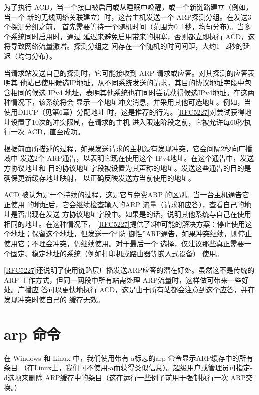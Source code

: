 为了执行 ACD，当一个接口被启用或从睡眠中唤醒，或一个新链路建立（例如，当一个
新的无线网络关联建立）时，这台主机发送一个 ARP探测分组。在发送3个探测分组之前，
首先需要等待一个随机时间（范围为0~1秒，均匀分布）。当多个系统同时启用时，通过
延迟来避免启用带来的拥塞，否则都立即执行 ACD，这将导致网络流量激增。探测分组之
间存在一个随机的时间间距，大约1 ~2秒的延迟（均匀分布）。

当请求站发送自己的探测时，它可能接收到 ARP 请求或应答。对其探测的应答表明其
他站已使用候选IP地址。从不同系统发送的请求，其目的协议地址字段中包含相同的候选
IPv4 地址，表明其他系统也在同时尝试获得候选IPv4地址。在这两种情况下，该系统将会
显示一个地址冲突消息，并采用其他可选地址。例如，当使用DHCP（见第6章）分配地址
时，这是推荐的行为。\href{https://www.rfc-editor.org/rfc/rfc5227}{[RFC5227]}对尝试获得地址设置了10次的冲突限制，在请求的主机
进入限速阶段之前，它被允许每60秒执行一次 ACD，直至成功。

根据前面所描述的过程，如果发送请求的主机没有发现冲突，它会间隔2秒向广播域中
发送2个 ARP通告，以表明它现在使用这个 IPv4地址。在这个通告中，发送方协议地址和
目的协议地址字段被设置为其声称的地址。发送这些通告的目的是确保更新缓存地址映射，
以正确反映发送方当前使用的地址。

ACD 被认为是一个持续的过程，这是它与免费ARP 的区别。当一台主机通告它正使用
的地址后，它会继续检查输人的ARP 流量（请求和应答），查看自己的地址是否出现在发送
方协议地址字段中。如果是的话，说明其他系统与自己在使用相同的地址。在这种情况下，
\href{https://www.rfc-editor.org/rfc/rfc5227}{[RFC5227]}提供了3种可能的解决方案：停止使用这个地址；保留这个地址，但发送一个“防
御性”ARP通告，如果冲突继续，则停止使用它；不理会冲突，仍继续使用。对于最后一个
选择，仅建议那些真正需要一个固定、稳定地址的系统（例如打印机或路由器等嵌人式设备）
使用。

\href{https://www.rfc-editor.org/rfc/rfc5227}{[RFC5227]}还说明了使用链路层广播发送ARP应答的潜在好处。虽然这不是传统的
ARP 工作方式，但同一网段中所有站需处理 ARP流量时，这样做可带来一些好处。广播应
答可以更快地执行 ACD，这是由于所有站都会注意到这个应答，并在发现冲突时使自己的
缓存无效。

\section{arp 命令}

在 Windows 和 Linux 中，我们使用带有-a标志的arp 命令显示ARP缓存中的所有条目
（在Linux上，我们可不使用-a而获得类似信息）。超级用户或管理员可指定-d选项来删除
ARP缓存中的条目（这在运行一些例子前用于强制执行一次 ARP交换。）

